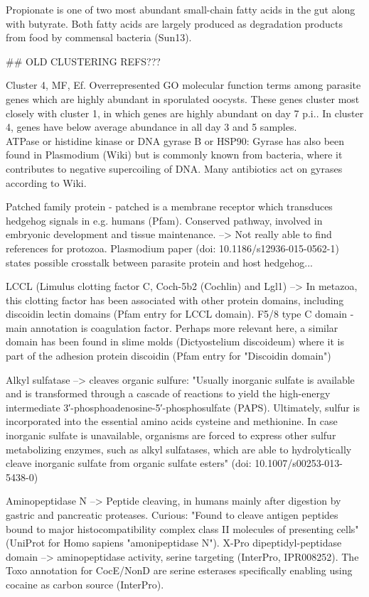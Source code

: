 \documentclass{article}
\begin{document}
Propionate is one of two most abundant small-chain fatty acids 
in the gut along with butyrate. Both fatty acids are largely produced as degradation products from food
by commensal bacteria (Sun13).


## OLD CLUSTERING REFS???


Cluster 4, MF, Ef.
Overrepresented GO molecular function terms among parasite genes which are highly abundant in
sporulated oocysts. These genes cluster most closely with cluster 1, in which genes are highly
abundant on day 7 p.i.. In cluster 4, genes have below average abundance in all day 3 and 5 samples.\\


ATPase or histidine kinase or DNA gyrase B or HSP90:
Gyrase has also been found in Plasmodium (Wiki) but is commonly known from bacteria, 
where it contributes to negative supercoiling of DNA. Many antibiotics act on gyrases
according to Wiki.

Patched family protein - patched is a membrane receptor which transduces hedgehog signals 
in e.g. humans (Pfam). Conserved pathway, involved in embryonic development and 
tissue maintenance. --> Not really able to find references for protozoa. Plasmodium
paper (doi:  10.1186/s12936-015-0562-1) states possible crosstalk between parasite
protein and host hedgehog...

LCCL (Limulus clotting factor C, Coch-5b2 (Cochlin) and Lgl1) -->
In metazoa, this clotting factor has been associated with other protein domains,
including discoidin lectin domains (Pfam entry for LCCL domain).
  F5/8 type C domain - main annotation is coagulation factor. Perhaps more 
relevant here, a similar domain has been found in slime molds (Dictyostelium discoideum)
where it is part of the adhesion protein discoidin (Pfam entry for "Discoidin domain")

Alkyl sulfatase --> cleaves organic sulfure: "Usually inorganic sulfate is 
available and is transformed through a cascade of reactions to yield the 
high-energy intermediate 3′-phosphoadenosine-5′-phosphosulfate (PAPS). 
Ultimately, sulfur is incorporated into the essential amino acids 
cysteine and methionine. In case inorganic sulfate is unavailable, organisms 
are forced to express other sulfur metabolizing enzymes, such as alkyl sulfatases,
which are able to hydrolytically cleave inorganic sulfate from organic sulfate 
esters" (doi:  10.1007/s00253-013-5438-0)
  
  Aminopeptidase N --> Peptide cleaving, in humans mainly after digestion by gastric
and pancreatic proteases. Curious: "Found to cleave antigen peptides bound to major 
histocompatibility complex class II molecules of presenting cells" (UniProt for
Homo sapiens "amonipeptidase N").
  X-Pro dipeptidyl-peptidase domain --> aminopeptidase activity, serine targeting
(InterPro, IPR008252). The Toxo annotation for CocE/NonD are serine esterases specifically
enabling using cocaine as carbon source (InterPro).
  
\end{document}
